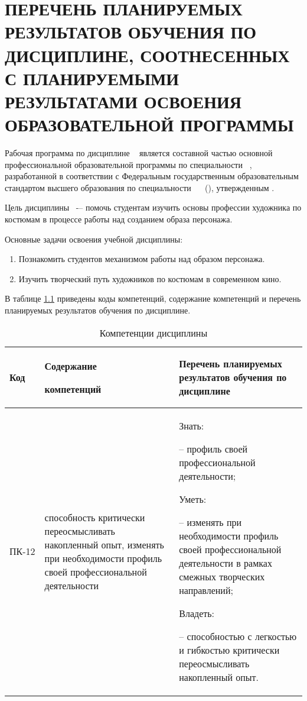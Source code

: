 \chapter{ПЕРЕЧЕНЬ ПЛАНИРУЕМЫХ РЕЗУЛЬТАТОВ ОБУЧЕНИЯ ПО ДИСЦИПЛИНЕ, СООТНЕСЕННЫХ С ПЛАНИРУЕМЫМИ РЕЗУЛЬТАТАМИ ОСВОЕНИЯ ОБРАЗОВАТЕЛЬНОЙ ПРОГРАММЫ} \label{chapt1}
Рабочая программа по дисциплине \DisciplineName~ является составной частью основной профессиональной образовательной программы по специальности \SpecialityCode~\SpecialityName, разработанной в соответствии с Федеральным государственным образовательным стандартом высшего образования по специальности \SpecialityCode~\SpecialityName~ (\QualificaionLevel), утвержденным \DocumentApprove.

Цель дисциплины \DisciplineName ~-– помочь студентам изучить основы профессии художника по костюмам в процессе работы над созданием образа персонажа.

Основные задачи освоения учебной дисциплины:
\begin{enumerate}
\item Познакомить студентов механизмом работы над образом персонажа.
\item Изучить творческий путь художников по костюмам в современном кино.
\end{enumerate}

В таблице \ref{tblCompetentions} приведены коды компетенций, содержание компетенций и перечень планируемых результатов обучения по дисциплине.

\begin{table} [ht]%
	\caption{Компетенции дисциплины}
	\label{tblCompetentions}	
	\begin{tabularx}{\textwidth}{p{}p{}X}
        \toprule
    	Код & Содержание \par компетенций & Перечень планируемых результатов обучения по дисциплине\\
        \midrule 
  		ПК-12 & способность критически переосмысливать накопленный опыт, изменять при необходимости профиль своей профессиональной деятельности & Знать: \par – профиль своей профессиональной деятельности; \par Уметь: \par – изменять при необходимости профиль своей профессиональной деятельности в рамках смежных творческих направлений; \par Владеть: \par – способностью с легкостью и гибкостью критически переосмысливать накопленный опыт.\\
        \bottomrule
	\end{tabularx}
\end{table}


